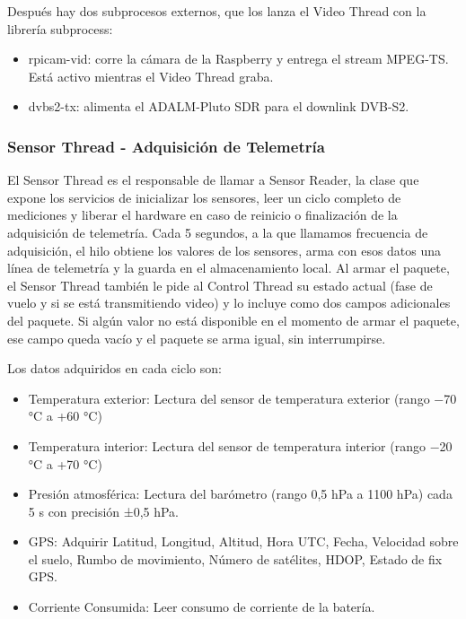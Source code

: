 \documentclass[12pt,a4paper]{article}
\begin{document}
Después hay dos subprocesos externos, que los lanza el Video Thread con la librería subprocess:

\begin{itemize}
\item
  rpicam-vid: corre la cámara de la Raspberry y entrega el stream MPEG-TS. Está activo mientras el Video Thread graba.
\item
  dvbs2-tx: alimenta el ADALM-Pluto SDR para el downlink DVB-S2.
\end{itemize}

\subsubsection{Sensor Thread - Adquisición de Telemetría}\label{sensor-thread---adquisiciuxf3n-de-telemetruxeda}

El Sensor Thread es el responsable de llamar a Sensor Reader, la clase que expone los servicios de inicializar los sensores, leer un ciclo completo de mediciones y liberar el hardware en caso de reinicio o finalización de la adquisición de telemetría. Cada 5 segundos, a la que llamamos frecuencia de adquisición, el hilo obtiene los valores de los sensores, arma con esos datos una línea de telemetría y la guarda en el almacenamiento local. Al armar el paquete, el Sensor Thread también le pide al Control Thread su estado actual (fase de vuelo y si se está transmitiendo video) y lo incluye como dos campos adicionales del paquete. Si algún valor no está disponible en el momento de armar el paquete, ese campo queda vacío y el paquete se arma igual, sin interrumpirse.

Los datos adquiridos en cada ciclo son:

\begin{itemize}
\item
  Temperatura exterior: Lectura del sensor de temperatura exterior (rango −70 °C a +60 °C)
\item
  Temperatura interior: Lectura del sensor de temperatura interior (rango −20 °C a +70 °C)
\item
  Presión atmosférica: Lectura del barómetro (rango 0,5 hPa a 1100 hPa) cada 5 s con precisión ±0,5 hPa.
\item
  GPS: Adquirir Latitud, Longitud, Altitud, Hora UTC, Fecha, Velocidad sobre el suelo, Rumbo de movimiento, Número de satélites, HDOP, Estado de fix GPS.
\item
  Corriente Consumida: Leer consumo de corriente de la batería.
\end{itemize}
\end{document}
